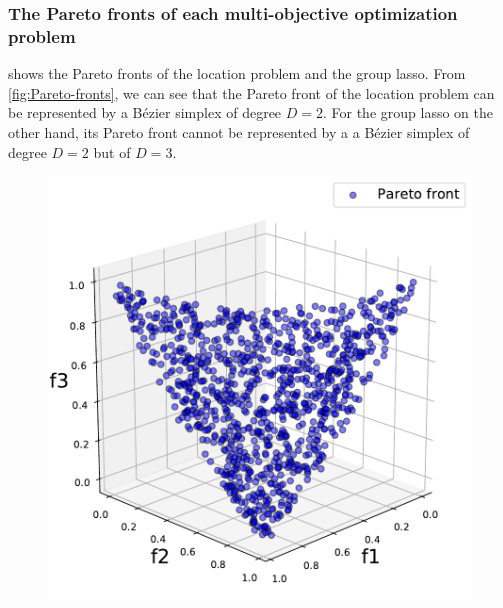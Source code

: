 \documentclass{article}
\begin{document}
\subsubsection{The Pareto fronts of each multi-objective optimization problem}\label{sec:Pareto-fronts}
 shows the Pareto fronts of the location problem and the group lasso.
From \cref{fig:Pareto-fronts}, we can see that the Pareto front of the location problem can be represented by a B\'ezier simplex of degree $D=2$.
For the group lasso on the other hand, its Pareto front cannot be represented by a a B\'ezier simplex of degree $D=2$ but of $D=3$. 
\begin{figure}[ht]
 \begin{minipage}{0.49\hsize}
        \centering
    \includegraphics[width=1\textwidth]{neurips2019/fig/pareto_med.pdf}
    \label{fig:Pareto-front-location-problem}
 \end{minipage}
 \begin{minipage}{0.49\hsize}
        \centering

\end{minipage}
\end{figure}
\end{document}
